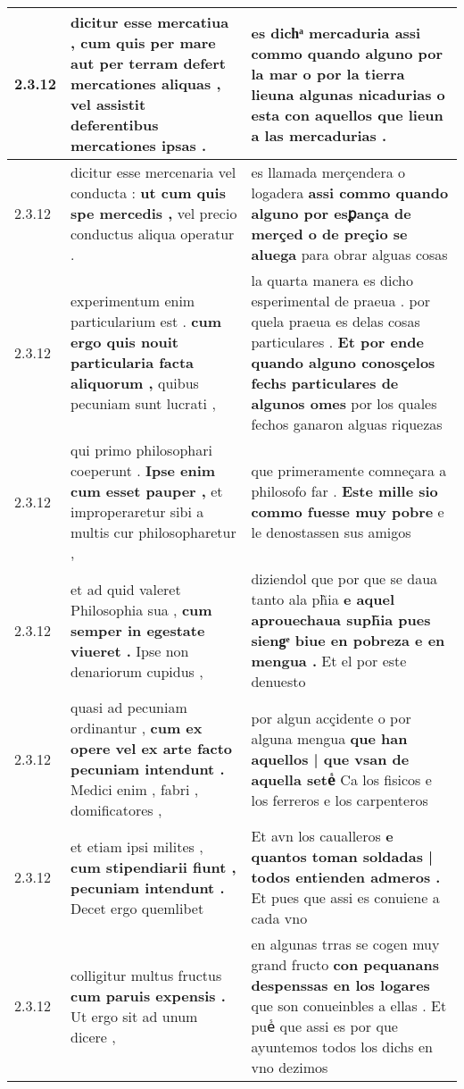 \begin{tabular}{|p{1cm}|p{6.5cm}|p{6.5cm}|}
2.3.12 & dicitur esse mercatiua , \textbf{ cum quis per mare aut per terram defert mercationes aliquas , } vel assistit deferentibus mercationes ipsas . & es dichͣ mercaduria \textbf{ assi commo quando alguno por la mar o por la tierra } lieuna algunas nicadurias o esta con aquellos que lieun a las mercadurias . \\\hline
2.3.12 & dicitur esse mercenaria vel conducta : \textbf{ ut cum quis spe mercedis , } vel precio conductus aliqua operatur . & es llamada merçendera o logadera \textbf{ assi commo quando alguno por esꝑança de merçed o de preçio se aluega } para obrar alguas cosas \\\hline
2.3.12 & experimentum enim particularium est . \textbf{ cum ergo quis nouit particularia facta aliquorum , } quibus pecuniam sunt lucrati , & la quarta manera es dicho esperimental de praeua . por quela praeua es delas cosas particulares . \textbf{ Et por ende quando alguno conosçelos fechs particulares de algunos omes } por los quales fechos ganaron alguas riquezas \\\hline
2.3.12 & qui primo philosophari coeperunt . \textbf{ Ipse enim cum esset pauper , } et improperaretur sibi a multis cur philosopharetur , & que primeramente comneçara a philosofo far . \textbf{ Este mille sio commo fuesse muy pobre } e le denostassen sus amigos \\\hline
2.3.12 & et ad quid valeret Philosophia sua , \textbf{ cum semper in egestate viueret . } Ipse non denariorum cupidus , & diziendol que por que se daua tanto ala ph̃ia \textbf{ e aquel aprouechaua suph̃ia pues siengͤ biue en pobreza e en mengua . } Et el por este denuesto \\\hline
2.3.12 & quasi ad pecuniam ordinantur , \textbf{ cum ex opere vel ex arte facto pecuniam intendunt . } Medici enim , fabri , domificatores , & por algun acçidente o por alguna mengua \textbf{ que han aquellos | que vsan de aquella seteᷤ } Ca los fisicos e los ferreros e los carpenteros \\\hline
2.3.12 & et etiam ipsi milites , \textbf{ cum stipendiarii fiunt , pecuniam intendunt . } Decet ergo quemlibet & Et avn los caualleros \textbf{ e quantos toman soldadas | todos entienden admeros . } Et pues que assi es conuiene a cada vno \\\hline
2.3.12 & colligitur multus fructus \textbf{ cum paruis expensis . } Ut ergo sit ad unum dicere , & en algunas trras se cogen muy grand fructo \textbf{ con pequanans despenssas en los logares } que son conueinbles a ellas . Et pueᷤ que assi es por que ayuntemos todos los dichs en vno dezimos \\\hline

\end{tabular}
